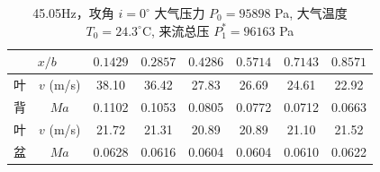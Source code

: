 \begin{table}[H]
  \centering
  \caption[45.05Hz 攻角 $i=0^\circ$ v/Ma 数据]{45.05Hz，攻角 $i=0^\circ$ 大气压力 $P_0=95898$ Pa, 大气温度 $T_0=24.3^\circ\text{C}$, 来流总压 $P_1^*=96163$ Pa}
  \label{tab:exp4_vma_45.05Hz_0}
  \renewcommand{\arraystretch}{1.2}
  \begin{tabular}{cccccccc}
    \toprule
    \multicolumn{2}{c}{$x/b$} & $0.1429$ & $0.2857$ & $0.4286$ & $0.5714$ & $0.7143$ & $0.8571$ \\
    \midrule
    叶 & $v$ (m/s) & 38.10 & 36.42 & 27.83 & 26.69 & 24.61 & 22.92 \\
    背 & $Ma$ & 0.1102 & 0.1053 & 0.0805 & 0.0772 & 0.0712 & 0.0663 \\
    \midrule
    叶 & $v$ (m/s) & 21.72 & 21.31 & 20.89 & 20.89 & 21.10 & 21.52 \\
    盆 & $Ma$ & 0.0628 & 0.0616 & 0.0604 & 0.0604 & 0.0610 & 0.0622 \\
    \bottomrule
  \end{tabular}
\end{table}